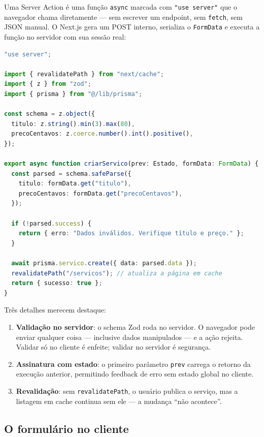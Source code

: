 Uma Server Action é uma função \texttt{async} marcada com \texttt{"use server"}
que o navegador chama diretamente — sem escrever um endpoint, sem
\texttt{fetch}, sem JSON manual. O Next.js gera um POST interno, serializa o
\texttt{FormData} e executa a função no servidor com sua sessão real:

\begin{lstlisting}[style=livro, language=TypeScript,
  caption={Server Action com validação e revalidação.}, label={list:fullstack-action}]
"use server";

import { revalidatePath } from "next/cache";
import { z } from "zod";
import { prisma } from "@/lib/prisma";

const schema = z.object({
  titulo: z.string().min(3).max(80),
  precoCentavos: z.coerce.number().int().positive(),
});

export async function criarServico(prev: Estado, formData: FormData) {
  const parsed = schema.safeParse({
    titulo: formData.get("titulo"),
    precoCentavos: formData.get("precoCentavos"),
  });

  if (!parsed.success) {
    return { erro: "Dados inválidos. Verifique título e preço." };
  }

  await prisma.servico.create({ data: parsed.data });
  revalidatePath("/servicos"); // atualiza a página em cache
  return { sucesso: true };
}
\end{lstlisting}

Três detalhes merecem destaque:

\begin{enumerate}[leftmargin=*, itemsep=0.4em]
  \item \textbf{Validação no servidor}: o schema Zod roda no servidor. O
  navegador pode enviar qualquer coisa — inclusive dados manipulados — e a
  ação rejeita. Validar só no cliente é enfeite; validar no servidor é segurança.
  \item \textbf{Assinatura com estado}: o primeiro parâmetro \texttt{prev}
  carrega o retorno da execução anterior, permitindo feedback de erro sem
  estado global no cliente.
  \item \textbf{Revalidação}: sem \texttt{revalidatePath}, o usuário publica o
  serviço, mas a listagem em cache continua sem ele — a mudança ``não
  acontece''.
\end{enumerate}

\subsection{O formulário no cliente}

